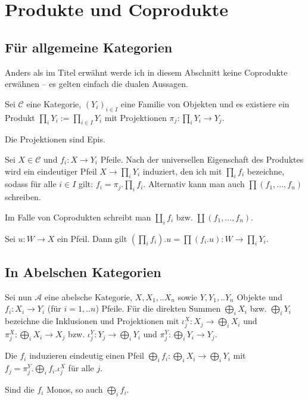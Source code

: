 \section{Produkte und Coprodukte}

\subsection{Für allgemeine Kategorien}

Anders als im Titel erwähnt werde ich in diesem Abschnitt keine Coprodukte erwähnen -- es gelten einfach die dualen Aussagen.

Sei $\mathcal C$ eine Kategorie, $(Y_i)_{i\in I}$ eine Familie von Objekten und es existiere ein Produkt $\prod_i Y_i := \prod_{i\in I} Y_i$ mit Projektionen $\pi_j : \prod_i Y_i \to Y_j$.

\begin{prop} Die Projektionen sind Epis.
\end{prop}

Sei $X\in \mathcal C$ und $f_i : X \to Y_i$ Pfeile. Nach der universellen Eigenschaft des Produktes wird ein eindeutiger Pfeil $X \to \prod_i Y_i$ induziert, den ich mit $\prod_i f_i$ bezeichne, sodass für alle $i\in I$ gilt: $f_i = \pi_j . \prod_i f_i$. Alternativ kann man auch $\prod(f_1,...,f_n)$ schreiben.

Im Falle von Coprodukten schreibt man $\coprod_i f_i$ bzw. $\coprod(f_1,...,f_n)$.

\begin{prop} Sei $u : W \to X$ ein Pfeil. Dann gilt $(\prod_i f_i) . u = \prod (f_i . u): W \to \prod_i Y_i$.
\end{prop}


\subsection{In Abelschen Kategorien}

Sei nun $\mathcal A$ eine abelsche Kategorie, $X,X_1,..X_n$ sowie $Y,Y_1,..Y_n$ Objekte und $f_i : X_i \to Y_i$ (für $i = 1,..n$) Pfeile.
Für die direkten Summen $\bigoplus_i X_i$ bzw. $\bigoplus_i Y_i$ bezeichne die Inklusionen und Projektionen mit $\iota^X_j : X_j \to \bigoplus_i X_i$ und $\pi^X_j : \bigoplus_i X_i \to X_j$ bzw. $\iota^Y_j : Y_j \to \bigoplus_i Y_i$ und $\pi^Y_j : \bigoplus_i Y_i \to Y_j$.

\begin{prop} Die $f_i$ induzieren eindeutig einen Pfeil $\bigoplus_i f_i : \bigoplus_i X_i \to \bigoplus_i Y_i$ mit $f_j = \pi^Y_j . \bigoplus_i f_i . \iota^X_j$ für alle $j$.
\end{prop}

\begin{prop} Sind die $f_i$ Monos, so auch $\bigoplus_i f_i$.
\end{prop}
